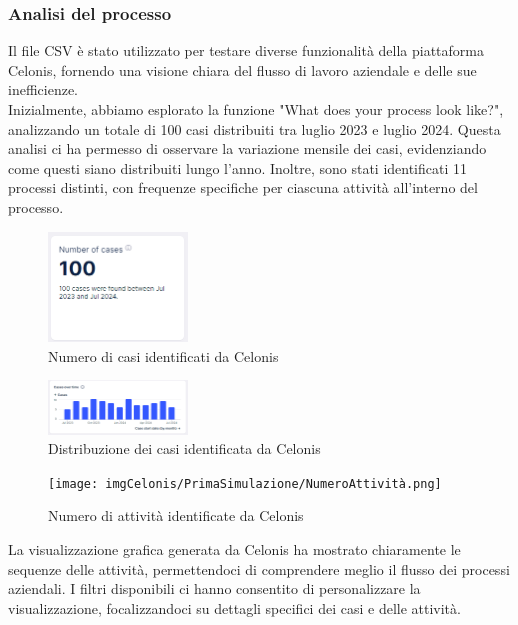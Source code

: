 \documentclass{article}
\begin{document}
\subsubsection{Analisi del processo}
Il file CSV è stato utilizzato per testare diverse funzionalità della piattaforma Celonis, fornendo una visione chiara del flusso di lavoro aziendale e delle sue inefficienze.\\
Inizialmente, abbiamo esplorato la funzione "What does your process look like?", analizzando un totale di 100 casi distribuiti tra luglio 2023 e luglio 2024. Questa analisi ci ha permesso di osservare la variazione mensile dei casi, evidenziando come questi siano distribuiti lungo l'anno. Inoltre, sono stati identificati 11 processi distinti, con frequenze specifiche per ciascuna attività all'interno del processo.\\
\begin{figure}[H]
    \centering
    \includegraphics[width=0.33\textwidth]{imgCelonis/PrimaSimulazione/NumeroCasi.png}
    \caption{Numero di casi identificati da Celonis}
    \label{fig:Casi-Identificati_Celonis}
\end{figure}
\begin{figure}[H]
    \centering
    \includegraphics[width=0.33\textwidth]{imgCelonis/PrimaSimulazione/DistribuzioneCasiMesi.png}
    \caption{Distribuzione dei casi identificata da Celonis}
    \label{fig:Distribuzione-Casi_Celonis}
\end{figure}
\begin{figure}[H]
    \centering
    \texttt{[image: imgCelonis/PrimaSimulazione/NumeroAttività.png]}
    \caption{Numero di attività identificate da Celonis}
    \label{fig:Attività-Identificate-Celonis}
\end{figure}
La visualizzazione grafica generata da Celonis ha mostrato chiaramente le sequenze delle attività, permettendoci di comprendere meglio il flusso dei processi aziendali. I filtri disponibili ci hanno consentito di personalizzare la visualizzazione, focalizzandoci su dettagli specifici dei casi e delle attività.\\
\end{document}
